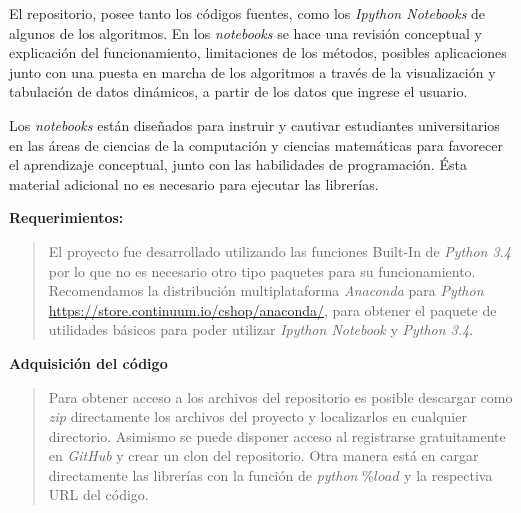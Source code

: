\documentclass[letterpaper,10pt,oneside]{sphinxmanual}
\theoremstyle{plain}%
\theoremstyle{definition}%
\theoremstyle{remark}%
\begin{document}
El repositorio, posee tanto los códigos fuentes, como los \textit{Ipython Notebooks} de algunos de los algoritmos. En los \textit{notebooks} se hace una revisión conceptual y explicación del funcionamiento, limitaciones de los métodos, posibles aplicaciones junto con una puesta en marcha de los algoritmos a través de la visualización y tabulación de datos dinámicos, a partir de los datos que ingrese el usuario.

Los \textit{notebooks} están diseñados para instruir y cautivar estudiantes universitarios en las áreas de ciencias de la computación y ciencias matemáticas para favorecer el aprendizaje conceptual, junto con las habilidades de programación. Ésta material adicional no es necesario para ejecutar las librerías.

\textbf{Requerimientos:}

\begin{quote}
El proyecto fue desarrollado utilizando las funciones Built-In de \textit{Python 3.4} por lo que no es
necesario otro tipo paquetes para su funcionamiento. Recomendamos la distribución multiplataforma \textit{Anaconda} para \textit{Python} \href{https://store.continuum.io/cshop/anaconda/}{https://store.continuum.io/cshop/anaconda/}, para obtener el paquete de utilidades básicos para poder utilizar \textit{Ipython Notebook} y \textit{Python 3.4}.
\end{quote}

\textbf{Adquisición del código}

\begin{quote}
Para obtener acceso a los archivos del repositorio es posible descargar como \textit{zip} directamente los archivos del proyecto y localizarlos en cualquier directorio. Asimismo se puede disponer acceso al registrarse gratuitamente en \textit{GitHub} y crear un clon del repositorio. Otra manera está en cargar directamente las librerías con la función de \textit{python} $\% load$ y la respectiva URL del código.
\end{quote}
\end{document}
